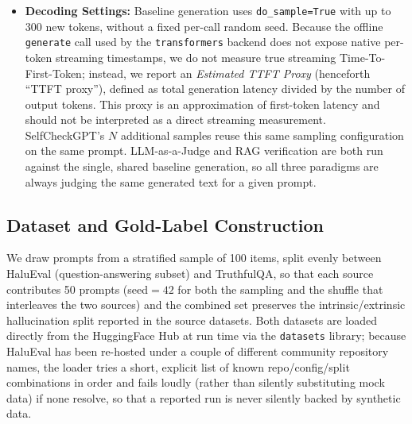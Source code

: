 \documentclass[conference]{IEEEtran}
\begin{document}
\begin{itemize}
    \item \textbf{Decoding Settings:} Baseline generation uses \texttt{do\_sample=True} with up to 300 new tokens, without a fixed per-call random seed. Because the offline \texttt{generate} call used by the \texttt{transformers} backend does not expose native per-token streaming timestamps, we do not measure true streaming Time-To-First-Token; instead, we report an \emph{Estimated TTFT Proxy} (henceforth ``TTFT proxy''), defined as total generation latency divided by the number of output tokens. This proxy is an approximation of first-token latency and should not be interpreted as a direct streaming measurement. SelfCheckGPT's $N$ additional samples reuse this same sampling configuration on the same prompt. LLM-as-a-Judge and RAG verification are both run against the single, shared baseline generation, so all three paradigms are always judging the same generated text for a given prompt.
\end{itemize}

\subsection{Dataset and Gold-Label Construction}

We draw prompts from a stratified sample of 100 items, split evenly between HaluEval (question-answering subset) and TruthfulQA, so that each source contributes 50 prompts (seed$=42$ for both the sampling and the shuffle that interleaves the two sources) and the combined set preserves the intrinsic/extrinsic hallucination split reported in the source datasets. Both datasets are loaded directly from the HuggingFace Hub at run time via the \texttt{datasets} library; because HaluEval has been re-hosted under a couple of different community repository names, the loader tries a short, explicit list of known repo/config/split combinations in order and fails loudly (rather than silently substituting mock data) if none resolve, so that a reported run is never silently backed by synthetic data.
\end{document}
